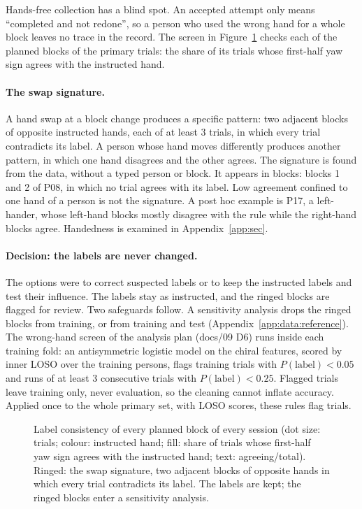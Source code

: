 Hands-free collection has a blind spot. An accepted attempt only means ``completed and not redone'', so a
person who used the wrong hand for a whole block leaves no trace in the record. The screen in
Figure~\ref{fig:S2_20_label_consistency} checks each of the  planned blocks of the
primary trials: the share of its trials whose first-half yaw sign agrees with the instructed hand.

\paragraph{The swap signature.} A hand swap at a block change produces a specific pattern: two adjacent blocks of
opposite instructed hands, each of at least 3 trials, in which every trial contradicts its label. A person
whose hand moves differently produces another pattern, in which one hand disagrees and the other agrees. The
signature is found from the data, without a typed person or block. It appears in 
blocks: blocks 1 and 2 of P08, in which no trial agrees with its label. Low agreement confined to one hand
of a person is not the signature. A post hoc example is P17, a left-hander, whose left-hand blocks mostly
disagree with the rule while the right-hand blocks agree. Handedness is examined in Appendix~\ref{app:sec}.

\paragraph{Decision: the labels are never changed.} The options were to correct suspected labels or to keep the
instructed labels and test their influence. The labels stay as instructed, and the ringed blocks are flagged for
review. Two safeguards follow. A sensitivity analysis drops the ringed blocks from training, or
from training and test (Appendix~\ref{app:data:reference}). The wrong-hand screen of the analysis plan
(docs/09 D6) runs inside each training fold: an antisymmetric logistic model on the chiral features, scored by
inner LOSO over the training persons, flags training trials with $P(\text{label}) < 0.05$ and runs of at least 3
consecutive trials with $P(\text{label}) < 0.25$. Flagged trials leave training only, never evaluation, so the
cleaning cannot inflate accuracy. Applied once to the whole primary set, with LOSO scores, these rules flag
 trials.

\begin{figure}[htbp]
\centering
{}
\caption{Label consistency of every planned block of every session (dot size: trials; colour: instructed hand;
fill: share of trials whose first-half yaw sign agrees with the instructed hand; text: agreeing/total). Ringed:
the swap signature, two adjacent blocks of opposite hands in which every trial contradicts its label. The
labels are kept; the ringed blocks enter a sensitivity analysis.}
\label{fig:S2_20_label_consistency}
\end{figure}


